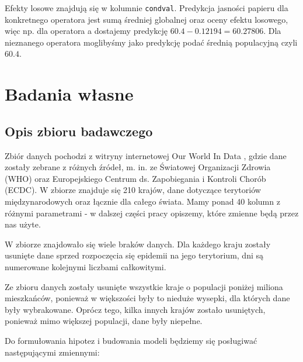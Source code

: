 \documentclass[12pt]{mwbk}
\theoremstyle{plain}
\theoremstyle{definition}
\theoremstyle{remark}
\begin{document}
 Efekty losowe znajdują się w kolumnie \texttt{condval}. Predykcja jasności papieru dla konkretnego operatora jest sumą średniej globalnej oraz oceny efektu losowego, więc np. dla operatora a dostajemy predykcję $60.4-0.12194=60.27806$. Dla nieznanego operatora moglibyśmy jako predykcję podać średnią populacyjną czyli $60.4$.

 
 
 
 
 
 
\chapter{Badania własne}
\section{Opis zbioru badawczego}

Zbiór danych pochodzi z witryny internetowej Our World In Data \cite{owid}, gdzie dane zostały zebrane z różnych źródeł, m. in. ze Światowej Organizacji Zdrowia (WHO) oraz Europejskiego Centrum ds. Zapobiegania i Kontroli Chorób (ECDC). W zbiorze znajduje się 210 krajów, dane dotyczące terytoriów międzynarodowych oraz łącznie dla całego świata. Mamy ponad 40 kolumn z różnymi parametrami - w dalszej części pracy opiszemy, które zmienne będą przez nas użyte.

W zbiorze znajdowało się wiele braków danych. Dla każdego kraju zostały usunięte dane sprzed rozpoczęcia się epidemii na jego terytorium, dni są numerowane kolejnymi liczbami całkowitymi.

Ze zbioru danych zostały usunięte wszystkie kraje o populacji poniżej miliona mieszkańców, ponieważ w większości były to nieduże wysepki, dla których dane były wybrakowane. Oprócz tego, kilka innych krajów zostało usuniętych, ponieważ mimo większej populacji, dane były niepełne.

Do formułowania hipotez i budowania modeli będziemy się posługiwać następującymi zmiennymi:
\end{document}
